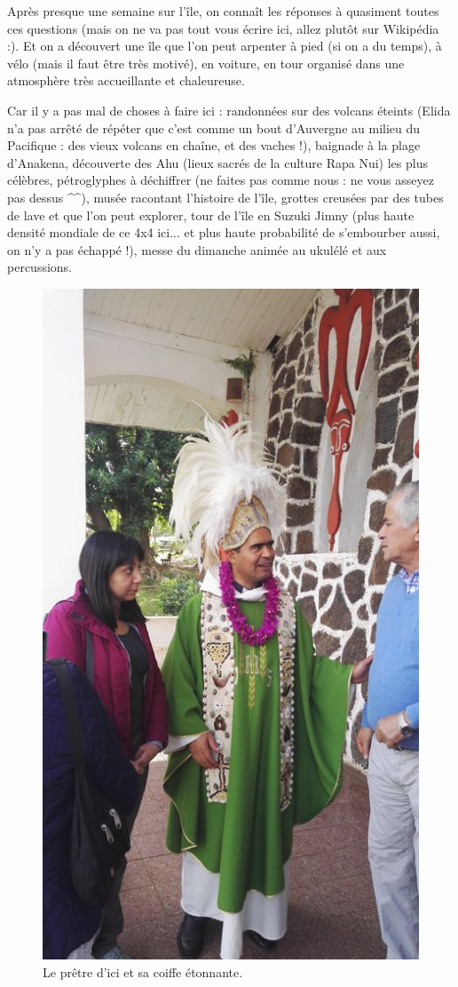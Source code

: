 Après presque une semaine sur l'île, on connaît les réponses à quasiment
toutes ces questions (mais on ne va pas tout vous écrire ici, allez
plutôt sur Wikipédia :). Et on a découvert une île que l'on peut
arpenter à pied (si on a du temps), à vélo (mais il faut être très
motivé), en voiture, en tour organisé dans une atmosphère très
accueillante et chaleureuse.

Car il y a pas mal de choses à faire ici : randonnées sur des volcans
éteints (Elida n'a pas arrêté de répéter que c'est comme un bout
d'Auvergne au milieu du Pacifique : des vieux volcans en chaîne, et des
vaches !), baignade à la plage d'Anakena, découverte des Ahu (lieux
sacrés de la culture Rapa Nui) les plus célèbres, pétroglyphes à
déchiffrer (ne faites pas comme nous : ne vous asseyez pas dessus
\^{}\^{}), musée racontant l'histoire de l'île, grottes creusées par des
tubes de lave et que l'on peut explorer, tour de l'île en Suzuki Jimny
(plus haute densité mondiale de ce 4x4 ici... et plus haute probabilité
de s'embourber aussi, on n'y a pas échappé !), messe du dimanche animée
au ukulélé et aux percussions.

\begin{figure}
\centering
\includegraphics{images/20180827_messe.jpg}
\caption{Le prêtre d'ici et sa coiffe étonnante.}
\end{figure}

